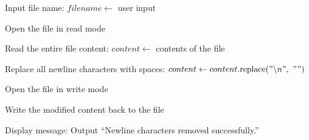 \begin{algorithm}
\caption{Remove Newline Characters from a File}
\begin{algorithmic}[1]

\STATE Input file name:
\STATE $filename \gets$ user input

\STATE Open the file in read mode

\STATE Read the entire file content:
\STATE $content \gets$ contents of the file

\STATE Replace all newline characters with spaces:
\STATE $content \gets content.\text{replace}("\backslash n",\ " ")$

\STATE Open the file in write mode

\STATE Write the modified content back to the file

\STATE Display message:
\STATE Output ``Newline characters removed successfully.''

\end{algorithmic}
\end{algorithm}